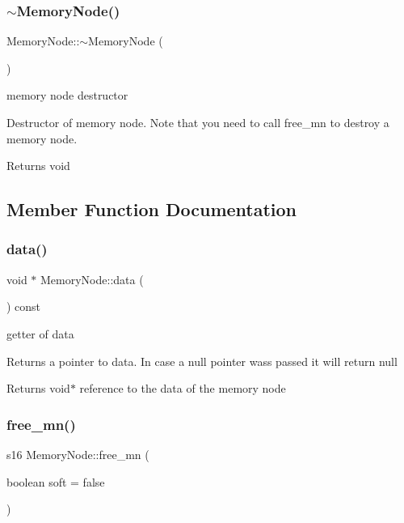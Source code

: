 \subsubsection{\texorpdfstring{$\sim$\+Memory\+Node()}{~MemoryNode()}}
{\footnotesize\ttfamily Memory\+Node\+::$\sim$\+Memory\+Node (\begin{DoxyParamCaption}{ }\end{DoxyParamCaption})}



memory node destructor 

Destructor of memory node. Note that you need to call free\+\_\+mn to destroy a memory node.

\begin{DoxyReturn}{Returns}
void 
\end{DoxyReturn}


\subsection{Member Function Documentation}
\mbox{\label{class_memory_node_a5f375b561aea9c23dd04c133d2ed9add}} 
\subsubsection{\texorpdfstring{data()}{data()}}
{\footnotesize\ttfamily void $\ast$ Memory\+Node\+::data (\begin{DoxyParamCaption}{ }\end{DoxyParamCaption}) const}



getter of data 

Returns a pointer to data. In case a null pointer wass passed it will return null

\begin{DoxyReturn}{Returns}
void$\ast$ reference to the data of the memory node 
\end{DoxyReturn}
\mbox{\label{class_memory_node_abd62af9897dd0f29a1a06490fc2c7570}} 
\subsubsection{\texorpdfstring{free\+\_\+mn()}{free\_mn()}}
{\footnotesize\ttfamily s16 Memory\+Node\+::free\+\_\+mn (\begin{DoxyParamCaption}\item[{boolean}]{soft = {\ttfamily false} }\end{DoxyParamCaption})}



